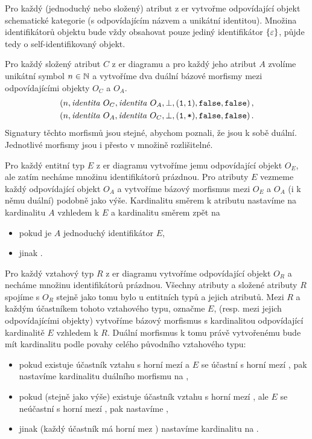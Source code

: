 Pro každý (jednoduchý nebo složený) atribut z \acrshort{er} vytvořme odpovídající objekt schematické kategorie (s odpovídajícím názvem a unikátní identitou).
Množina identifikátorů objektu bude vždy obsahovat pouze jediný identifikátor $\left\{\varepsilon\right\}$, půjde tedy o self-identifikovaný objekt.

Pro každý složený atribut $C$ z \acrshort{er} diagramu a pro každý jeho atribut $A$ zvolíme unikátní symbol $n\in \mathbb{N}$ a vytvoříme dva duální bázové morfismy mezi odpovídajícími objekty $O_C$ a $O_A$.
\begin{align*}
  (n, \mathit{identita}\ O_C, \mathit{identita}\ O_A, \bot, (\texttt{1}, \texttt{1}), \texttt{false}, \texttt{false})\,, \\
  (n, \mathit{identita}\ O_A, \mathit{identita}\ O_C, \bot, (\texttt{1}, \texttt{*}), \texttt{false}, \texttt{false})\,.
\end{align*}
Signatury těchto morfismů jsou stejné, abychom poznali, že jsou k sobě duální.
Jednotlivé morfismy jsou i přesto v množině rozlišitelné.

Pro každý entitní typ $E$ z \acrshort{er} diagramu vytvoříme jemu odpovídající objekt $O_E$, ale zatím necháme množinu identifikátorů prázdnou.
Pro atributy $E$ vezmeme každý odpovídající objekt $O_A$ a vytvoříme bázový morfismus mezi $O_E$ a $O_A$ (i k němu duální) podobně jako výše.
Kardinalitu směrem k atributu nastavíme na kardinalitu $A$ vzhledem k $E$ a kardinalitu směrem zpět na
\begin{itemize}
  \item \oneone{} pokud je $A$ jednoduchý identifikátor $E$,
  \item jinak \onemany{}.
\end{itemize}

Pro každý vztahový typ $R$ z \acrshort{er} diagramu vytvoříme odpovídající objekt $O_R$ a necháme množinu identifikátorů prázdnou.
Všechny atributy a složené atributy $R$ spojíme s $O_R$ stejně jako tomu bylo u entitních typů a jejich atributů.
Mezi $R$ a každým účastníkem tohoto vztahového typu, označme $E$, (resp. mezi jejich odpovídajícími objekty) vytvoříme bázový morfismus s kardinalitou odpovídající kardinalitě $E$ vzhledem k $R$.
Duální morfismus k tomu právě vytvořenému bude mít kardinalitu podle povahy celého původního vztahového typu:
\begin{itemize}
  \item pokud existuje účastník vztahu s horní mezí \one{} a $E$ se účastní s horní mezí \one{}, pak nastavíme kardinalitu duálního morfismu na \oneone{},
  \item pokud (stejně jako výše) existuje účastník vztahu s horní mezí \one{}, ale $E$ se neúčastní s horní mezí \one{}, pak nastavíme \onemany{},
  \item jinak (každý účastník má horní mez \many{}) nastavíme kardinalitu na \oneone{}.
\end{itemize}


